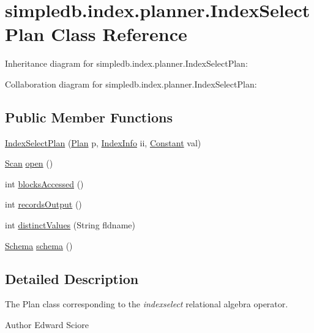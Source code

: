 \hypertarget{classsimpledb_1_1index_1_1planner_1_1IndexSelectPlan}{}\section{simpledb.\+index.\+planner.\+Index\+Select\+Plan Class Reference}
\label{classsimpledb_1_1index_1_1planner_1_1IndexSelectPlan}


Inheritance diagram for simpledb.\+index.\+planner.\+Index\+Select\+Plan\+:


Collaboration diagram for simpledb.\+index.\+planner.\+Index\+Select\+Plan\+:
\subsection*{Public Member Functions}
\begin{DoxyCompactItemize}
\item 
\hyperlink{classsimpledb_1_1index_1_1planner_1_1IndexSelectPlan_a829c5720b9ebde1791f0b59c40a0a8aa}{Index\+Select\+Plan} (\hyperlink{interfacesimpledb_1_1plan_1_1Plan}{Plan} p, \hyperlink{classsimpledb_1_1metadata_1_1IndexInfo}{Index\+Info} ii, \hyperlink{classsimpledb_1_1query_1_1Constant}{Constant} val)
\item 
\hyperlink{interfacesimpledb_1_1query_1_1Scan}{Scan} \hyperlink{classsimpledb_1_1index_1_1planner_1_1IndexSelectPlan_af1acee7f900bcacf37d2ff1100a31545}{open} ()
\item 
int \hyperlink{classsimpledb_1_1index_1_1planner_1_1IndexSelectPlan_ae88ded6d91db76c651532f94a59ef97a}{blocks\+Accessed} ()
\item 
int \hyperlink{classsimpledb_1_1index_1_1planner_1_1IndexSelectPlan_abbbff69541cb3700bf74674f851297bc}{records\+Output} ()
\item 
int \hyperlink{classsimpledb_1_1index_1_1planner_1_1IndexSelectPlan_a7552fbdecccb53183ce575051cdb93a1}{distinct\+Values} (String fldname)
\item 
\hyperlink{classsimpledb_1_1record_1_1Schema}{Schema} \hyperlink{classsimpledb_1_1index_1_1planner_1_1IndexSelectPlan_a3010453110b539de5e3af184131dee7a}{schema} ()
\end{DoxyCompactItemize}


\subsection{Detailed Description}
The Plan class corresponding to the {\itshape indexselect} relational algebra operator. \begin{DoxyAuthor}{Author}
Edward Sciore 
\end{DoxyAuthor}


